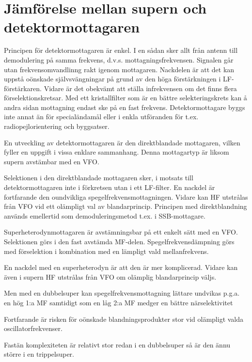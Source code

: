 \section{Jämförelse mellan supern och detektormottagaren}
\label{superheterojämförelse}

Principen för detektormottagaren är enkel. I en sådan sker allt från
antenn till demodulering på samma frekvens,
d.v.s. mottagningsfrekvensen. Signalen går utan frekvensomvandlinng
rakt igenom mottagaren. Nackdelen är att det kan uppstå oönskade
självsvängningar på grund av den höga förstärkningen i
LF-förstärkaren. Vidare är det obekvämt att ställa infrekvensen om det
finns flera förselektionskretsar. Med ett kristallfilter som är en
bättre selekteringskrets kan å andra sidan mottagning endast ske på en
fast frekvens. Detektormottagare byggs inte annat än för
specialändamål eller i enkla utföranden för
t.ex. radiopejlorientering och byggsatser.

En utveckling av detektormottagaren är den direktblandade mottagaren,
vilken fyller en uppgift i vissa enklare sammanhang.  Denna mottagartyp
är liksom supern avstämbar med en VFO.

Selektionen i den direktblandade mottagaren sker, i motsats till
detektormottagaren inte i förkretsen utan i ett LF-filter. En nackdel
är fortfarande den oundvikliga spegelfrekvensmottagningen. Vidare kan
HF utstrålas från VFO vid ett olämpligt val av
blandarprincip. Principen med direktblandning används emellertid som
demoduleringsmetod t.ex. i SSB-mottagare.

Superheterodynmottagaren är avstämningsbar på ett enkelt sätt med en
VFO. Selektionen görs i den fast avstämda
MF-delen. Spegelfrekvensdämpning görs med förselektion i kombination
med en lämpligt vald mellanfrekvens.

En nackdel med en superheterodyn är att den är mer komplicerad. Vidare
kan även i supern HF utstrålas från VFO om olämplig blandarprincip
väljs.

Men med en dubbelsuper kan spegelfrekvensmottagning lättare undvikas
p.g.a.  en hög 1:a MF samtidigt som en låg 2:a MF medger en bättre
närselektivitet

Fortfarande är risken för oönskade blandningsprodukter stor vid
olämpligt valda oscillatorfrekvenser.

Fastän komplexiteten är relativt stor redan i en dubbelsuper så är den
ännu större i en trippelsuper.
